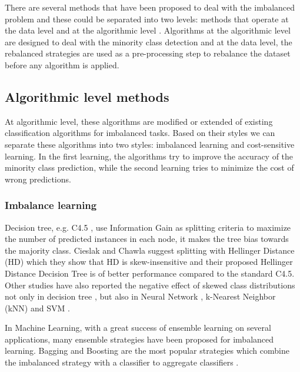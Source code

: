 There are several methods that have been proposed to deal with the imbalanced problem and these could be separated into two levels: methods that operate at the data level and at the algorithmic level \citep{chawla2004special}. Algorithms at the algorithmic level are designed to deal with the minority class detection and at the data level, the rebalanced strategies are used as a pre-processing step to rebalance the dataset before any algorithm is applied.


\subsection*{Algorithmic level methods}
\label{algorithmic_level_methods}


At algorithmic level, these algorithms are modified or extended of existing classification algorithms for imbalanced tasks. Based on their styles we can separate these algorithms into two styles: imbalanced learning and cost-sensitive learning. In the first learning, the algorithms try to improve the accuracy of the minority class prediction, while the second learning tries to minimize the cost of wrong predictions.


\subsubsection*{Imbalance learning}
\label{imbalance_learning}

Decision tree, e.g. C4.5 \cite{quinlan2014c4}, use Information Gain as splitting criteria to maximize the number of predicted instances in each node, it makes the tree bias towards the majority class. Cieslak and Chawla \citep{cieslak2008learning} suggest splitting with Hellinger Distance (HD) which they show that HD is skew-insensitive and their proposed Hellinger Distance Decision Tree is of better performance compared to the standard C4.5. Other studies have also reported the negative effect of skewed class distributions not only in decision tree \citep{he2009learning, japkowicz2002class}, but also in Neural Network \citep{japkowicz2002class, visa2005issues}, k-Nearest Neighbor (kNN) \citep{kubat1997addressing, mani2003knn, batista2004study} and SVM \citep{yan2003predicting, wu2003class}.

In Machine Learning, with a great success of ensemble learning on several applications, many ensemble strategies have been proposed for imbalanced learning. Bagging \citep{breiman1996bagging} and Boosting \citep{freund1996experiments} are the most popular strategies which combine the imbalanced strategy with a classifier to aggregate classifiers \citep{liu2009exploratory, wang2009diversity, vilarino2005experiments, kang2006eus, liu2006boosting, wang2010boosting, chawla2003smoteboost, joshi2001evaluating, mease2007boosted}.


